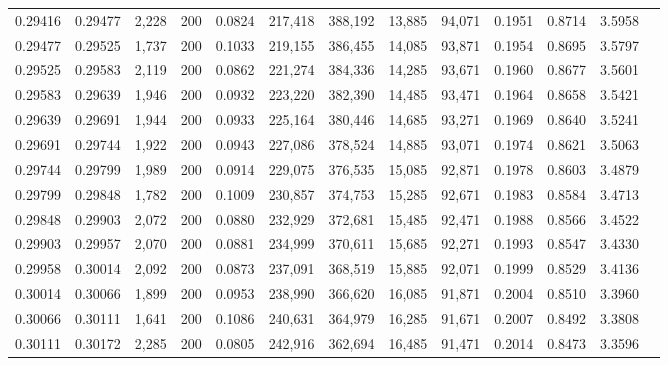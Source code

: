 \begin{tabular}{rrrrrrrrrrrrr}
0.29416 & 0.29477 & 2,228 & 200 &                                     0.0824 & 217,418 & 388,192 &  13,885 &  94,071 & 0.1951 & 0.8714 & 3.5958 \\
0.29477 & 0.29525 & 1,737 & 200 &                                     0.1033 & 219,155 & 386,455 &  14,085 &  93,871 & 0.1954 & 0.8695 & 3.5797 \\
0.29525 & 0.29583 & 2,119 & 200 &                                     0.0862 & 221,274 & 384,336 &  14,285 &  93,671 & 0.1960 & 0.8677 & 3.5601 \\
0.29583 & 0.29639 & 1,946 & 200 &                                     0.0932 & 223,220 & 382,390 &  14,485 &  93,471 & 0.1964 & 0.8658 & 3.5421 \\
0.29639 & 0.29691 & 1,944 & 200 &                                     0.0933 & 225,164 & 380,446 &  14,685 &  93,271 & 0.1969 & 0.8640 & 3.5241 \\
0.29691 & 0.29744 & 1,922 & 200 &                                     0.0943 & 227,086 & 378,524 &  14,885 &  93,071 & 0.1974 & 0.8621 & 3.5063 \\
0.29744 & 0.29799 & 1,989 & 200 &                                     0.0914 & 229,075 & 376,535 &  15,085 &  92,871 & 0.1978 & 0.8603 & 3.4879 \\
0.29799 & 0.29848 & 1,782 & 200 &                                     0.1009 & 230,857 & 374,753 &  15,285 &  92,671 & 0.1983 & 0.8584 & 3.4713 \\
0.29848 & 0.29903 & 2,072 & 200 &                                     0.0880 & 232,929 & 372,681 &  15,485 &  92,471 & 0.1988 & 0.8566 & 3.4522 \\
0.29903 & 0.29957 & 2,070 & 200 &                                     0.0881 & 234,999 & 370,611 &  15,685 &  92,271 & 0.1993 & 0.8547 & 3.4330 \\
0.29958 & 0.30014 & 2,092 & 200 &                                     0.0873 & 237,091 & 368,519 &  15,885 &  92,071 & 0.1999 & 0.8529 & 3.4136 \\
0.30014 & 0.30066 & 1,899 & 200 &                                     0.0953 & 238,990 & 366,620 &  16,085 &  91,871 & 0.2004 & 0.8510 & 3.3960 \\
0.30066 & 0.30111 & 1,641 & 200 &                                     0.1086 & 240,631 & 364,979 &  16,285 &  91,671 & 0.2007 & 0.8492 & 3.3808 \\
0.30111 & 0.30172 & 2,285 & 200 &                                     0.0805 & 242,916 & 362,694 &  16,485 &  91,471 & 0.2014 & 0.8473 & 3.3596 \\

\end{tabular}
